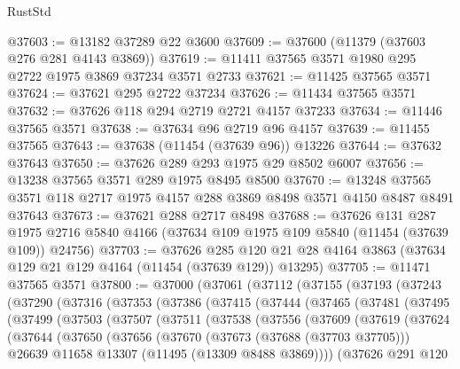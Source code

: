 \begin{lexlean}{RustStd}
\begin{coremodule}
@37603 := @13182 @37289 @22 @3600
@37609 := @37600 (@11379 (@37603 @276 @281 @4143 @3869))
@37619 := @11411 @37565 @3571 @1980 @295 @2722 @1975 @3869 @37234 @3571 @2733
@37621 := @11425 @37565 @3571
@37624 := @37621 @295 @2722 @37234
@37626 := @11434 @37565 @3571
@37632 := @37626 @118 @294 @2719 @2721 @4157 @37233
@37634 := @11446 @37565 @3571
@37638 := @37634 @96 @2719 @96 @4157
@37639 := @11455 @37565
@37643 := @37638 (@11454 (@37639 @96)) @13226
@37644 := @37632 @37643
@37650 := @37626 @289 @293 @1975 @29 @8502 @6007
@37656 := @13238 @37565 @3571 @289 @1975 @8495 @8500
@37670 := @13248 @37565 @3571 @118 @2717 @1975 @4157 @288 @3869 @8498 @3571 @4150 @8487 @8491 @37643
@37673 := @37621 @288 @2717 @8498
@37688 := @37626
    @131
    @287
    @1975
    @2716
    @5840
    @4166
    (@37634 @109 @1975 @109 @5840 (@11454 (@37639 @109)) @24756)
@37703 := @37626
    @285
    @120
    @21
    @28
    @4164
    @3863
    (@37634 @129 @21 @129 @4164 (@11454 (@37639 @129)) @13295)
@37705 := @11471 @37565 @3571
@37800 := @37000
    (@37061
      (@37112
        (@37155
          (@37193
            (@37243
              (@37290
                (@37316
                  (@37353
                    (@37386
                      (@37415
                        (@37444
                          (@37465
                            (@37481
                              (@37495
                                (@37499
                                  (@37503
                                    (@37507
                                      (@37511
                                        (@37538
                                          (@37556
                                            (@37609
                                              (@37619
                                                (@37624
                                                  (@37644
                                                    (@37650
                                                      (@37656
                                                        (@37670
                                                          (@37673 (@37688 (@37703 @37705)))
                                                          @26639
                                                          @11658
                                                          @13307
                                                          (@11495 (@13309 @8488 @3869))))
                                                      (@37626
                                                        @291
                                                        @120

\end{coremodule}
\end{lexlean}
